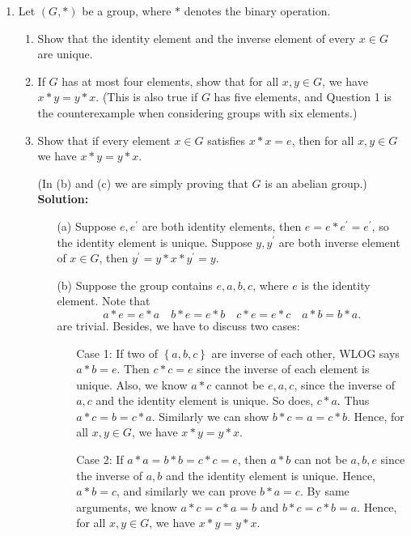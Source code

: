 \begin{enumerate}
    \item Let $(G, \ast)$ be a group, where $\ast$ denotes the binary operation.
    \begin{enumerate}
        \item Show that the identity element and the inverse element of every $x \in G$ are unique.
        \item If $G$ has at most four elements, show that for all $x,y \in G$, we have $x \ast y = y \ast x$.
              (This is also true if $G$ has five elements, and Question 1 is the counterexample
              when considering groups with six elements.)
        \item Show that if every element $x \in G$ satisfies $x \ast x = e$, then for all $x,y \in G$
              we have $x \ast y = y \ast x$.

              (In (b) and (c) we are simply proving that $G$ is an abelian group.) \\
        \textbf{Solution:} \vphantom{text}
        \begin{itemize}
            \item [(a)] Suppose \(e, e^{\prime} \) are both identity elements, then \(e = e * e^{\prime} = e^{\prime} \), so the identity element is unique. Suppose \(y, y^{\prime} \) are both inverse element of \(x \in G\), then \(y^{\prime} = y * x * y^{\prime} = y\).     
            \item [(b)] Suppose the group contains \(e, a, b, c\), where \(e\) is the identity element. Note that 
                \[
                    a * e = e * a \quad b * e = e * b \quad c * e = e * c \quad a * b = b * a.
                \] are trivial. Besides, we have to discuss two cases: 
            \begin{itemize}
                \item [Case 1:] If two of \(\left\{ a,b,c \right\} \) are inverse of each other, WLOG says \(a * b = e\). Then \(c * c = e\) since the inverse of each element is unique. Also, we know \(a * c\) cannot be \(e, a, c\), since the inverse of \(a, c\) and the identity element is unique. So does, \(c * a\). Thus \(a * c = b = c * a\). Similarly we can show \(b * c = a = c * b\). Hence, for all \(x, y \in G\), we have \(x * y = y * x\). 
                \item [Case 2:] If \(a * a = b * b = c * c = e\), then \(a * b\) can not be \(a, b, e\) since the inverse of \(a,b\) and the identity element is unique. Hence, \(a * b = c\), and similarly we can prove \(b * a = c\). By same arguments, we know \(a * c = c * a = b\) and \(b * c = c * b = a\). Hence, for all \(x, y \in G\), we have \(x * y = y * x\).                 

\end{itemize}
\end{itemize}
\end{enumerate}
\end{enumerate}
